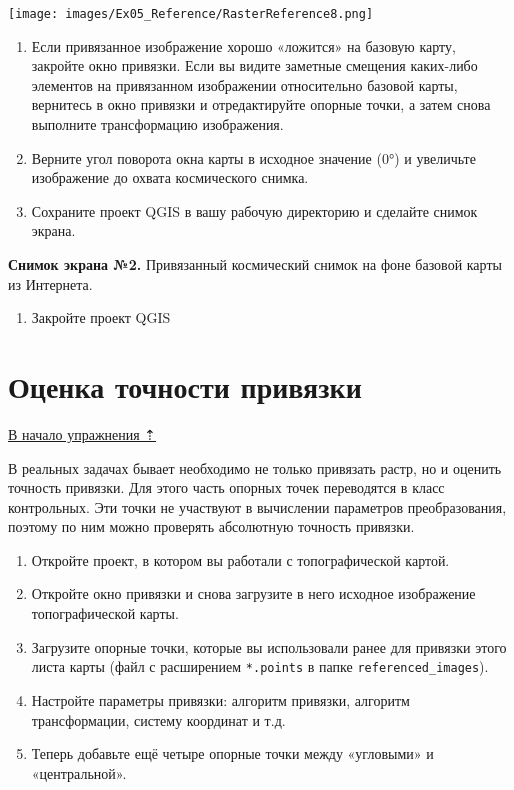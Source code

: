 \documentclass[
  12pt,
]{book}
\providecommand{\tightlist}{%
  \setlength{\itemsep}{0pt}\setlength{\parskip}{0pt}}
\begin{document}
\texttt{[image: images/Ex05\_Reference/RasterReference8.png]}

\begin{enumerate}
\def\labelenumi{\arabic{enumi}.}
\setcounter{enumi}{10}
\item
  Если привязанное изображение хорошо «ложится» на базовую карту, закройте окно привязки. Если вы видите заметные смещения каких-либо элементов на привязанном изображении относительно базовой карты, вернитесь в окно привязки и отредактируйте опорные точки, а затем снова выполните трансформацию изображения.
\item
  Верните угол поворота окна карты в исходное значение (0°) и увеличьте изображение до охвата космического снимка.
\item
  Сохраните проект QGIS в вашу рабочую директорию и сделайте снимок экрана.
\end{enumerate}

\textbf{Снимок экрана №2.} Привязанный космический снимок на фоне базовой карты из Интернета.

\begin{enumerate}
\def\labelenumi{\arabic{enumi}.}
\setcounter{enumi}{13}
\tightlist
\item
  Закройте проект QGIS
\end{enumerate}

\hypertarget{raster-reference-accuracy}{%
\section{Оценка точности привязки}\label{raster-reference-accuracy}}

\protect\hyperlink{raster-reference}{В начало упражнения ⇡}

В реальных задачах бывает необходимо не только привязать растр, но и оценить точность привязки. Для этого часть опорных точек переводятся в класс контрольных. Эти точки не участвуют в вычислении параметров преобразования, поэтому по ним можно проверять абсолютную точность привязки.

\begin{enumerate}
\def\labelenumi{\arabic{enumi}.}
\item
  Откройте проект, в котором вы работали с топографической картой.
\item
  Откройте окно привязки и снова загрузите в него исходное изображение топографической карты.
\item
  Загрузите опорные точки, которые вы использовали ранее для привязки этого листа карты (файл с расширением \texttt{*.points} в папке \texttt{referenced\_images}).
\item
  Настройте параметры привязки: алгоритм привязки, алгоритм трансформации, систему координат и т.д.
\item
  Теперь добавьте ещё четыре опорные точки между «угловыми» и «центральной».
\end{enumerate}
\end{document}

